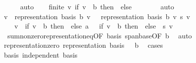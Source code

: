 \begin{isabellebody}
\ \ \ \ \isamarkupfalse%
\ auto\isanewline
\ \ \isamarkupfalse%
\ {\isachardoublequoteopen}finite\ {\isacharbraceleft}{\kern0pt}v{\isachardot}{\kern0pt}\ {\isacharparenleft}{\kern0pt}if\ v\ {\isacharequal}{\kern0pt}\ b\ then\ {}\ else\ {}{\isacharparenright}{\kern0pt}\ {\isasymnoteq}\ {}{\isacharbraceright}{\kern0pt}{\isachardoublequoteclose}\ \isamarkupfalse%
\ {\isacharasterisk}{\kern0pt}\ \isamarkupfalse%
\ auto\isanewline
\ \ \isamarkupfalse%
\ {\isachardoublequoteopen}{\isacharparenleft}{\kern0pt}{\isasymSum}v\ {\isacharbar}{\kern0pt}\ representation\ basis\ b\ v\ {\isasymnoteq}\ {}{\isachardot}{\kern0pt}\ representation\ basis\ b\ v\ {\isacharasterisk}{\kern0pt}s\ v{\isacharparenright}{\kern0pt}\ {\isacharequal}{\kern0pt}\isanewline
\ \ \ \ {\isacharparenleft}{\kern0pt}{\isasymSum}v\ {\isacharbar}{\kern0pt}\ {\isacharparenleft}{\kern0pt}if\ v\ {\isacharequal}{\kern0pt}\ b\ then\ {}\ else\ {}{\isacharcolon}{\kern0pt}{\isacharcolon}{\kern0pt}{\isacharprime}{\kern0pt}a{\isacharparenright}{\kern0pt}\ {\isasymnoteq}\ {}{\isachardot}{\kern0pt}\ {\isacharparenleft}{\kern0pt}if\ v\ {\isacharequal}{\kern0pt}\ b\ then\ {}\ else\ {}{\isacharparenright}{\kern0pt}\ {\isacharasterisk}{\kern0pt}s\ v{\isacharparenright}{\kern0pt}{\isachardoublequoteclose}\isanewline
\ \ \ \ \isamarkupfalse%
\ {\isacharasterisk}{\kern0pt}\ sum{\isacharunderscore}{\kern0pt}nonzero{\isacharunderscore}{\kern0pt}representation{\isacharunderscore}{\kern0pt}eq{\isacharbrackleft}{\kern0pt}OF\ basis\ span{\isacharunderscore}{\kern0pt}base{\isacharbrackleft}{\kern0pt}OF\ b{\isacharbrackright}{\kern0pt}{\isacharbrackright}{\kern0pt}\ \isamarkupfalse%
\ auto\isanewline
{}\isamarkupfalse%
%
\endisatagproof
{\isafoldproof}%
%
\isadelimproof
\isanewline
%
\endisadelimproof
\isanewline
{}\isamarkupfalse%
\ representation{\isacharunderscore}{\kern0pt}zero{\isacharcolon}{\kern0pt}\ {\isachardoublequoteopen}representation\ basis\ {}\ {\isacharequal}{\kern0pt}\ {\isacharparenleft}{\kern0pt}{\isasymlambda}b{\isachardot}{\kern0pt}\ {}{\isacharparenright}{\kern0pt}{\isachardoublequoteclose}\isanewline
%
\isadelimproof
%
\endisadelimproof
%
\isatagproof
{}\isamarkupfalse%
\ cases\isanewline
\ \ \isamarkupfalse%
\ basis{\isacharcolon}{\kern0pt}\ {\isachardoublequoteopen}independent\ basis{\isachardoublequoteclose}\ \isamarkupfalse%

\end{isabellebody}
